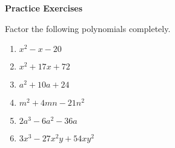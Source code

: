 \textbf{Practice Exercises}

\vspce

Factor the following polynomials completely. 

\begin{enumerate}


\item \hspce $x^{2} - x - 20$
\item \hspce $x^{2} + 17x + 72$
\item \hspce $a^{2} + 10a + 24	$
\item \hspce $m^{2} + 4 m n - 21 n^{2}$
\item \hspce $2a^{3} - 6a^{2} - 36a$
\item \hspce $3 x^{3} - 27 x^{2} y + 54 x y^{2}$
  
\end{enumerate}